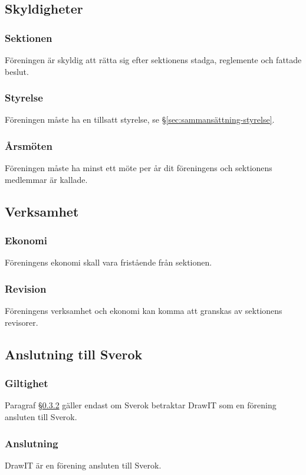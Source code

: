 \subsection{Skyldigheter}

\subsubsection{Sektionen}
Föreningen är skyldig att rätta sig efter sektionens stadga, reglemente och fattade beslut.

\subsubsection{Styrelse}
Föreningen måste ha en tillsatt styrelse, se §\ref{sec:sammansättning-styrelse}.

\subsubsection{Årsmöten}
Föreningen måste ha minst ett möte per år dit föreningens och sektionens medlemmar är kallade.



\subsection{Verksamhet}

\subsubsection{Ekonomi}
Föreningens ekonomi skall vara fristående från sektionen.

\subsubsection{Revision}
Föreningens verksamhet och ekonomi kan komma att granskas av sektionens revisorer.



\subsection{Anslutning till Sverok}

\subsubsection{Giltighet}
Paragraf §\ref{sec:anslut-sverok} gäller endast om Sverok betraktar DrawIT som en förening ansluten
till Sverok.

\subsubsection{Anslutning} \label{sec:anslut-sverok}
DrawIT är en förening ansluten till Sverok.

